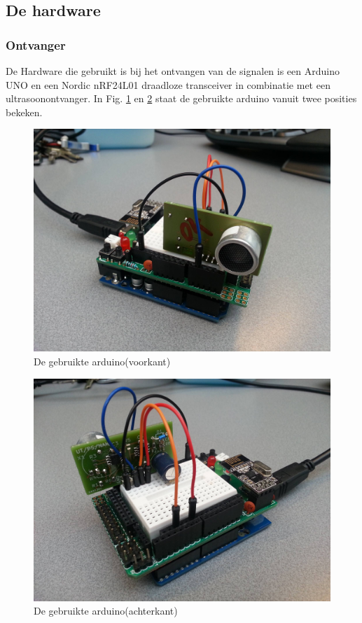 \documentclass{article}
\begin{document}
\subsection{De hardware}
\subsubsection{Ontvanger}
De Hardware die gebruikt is bij het ontvangen van de signalen is een Arduino UNO en een Nordic nRF24L01 draadloze transceiver in combinatie met een ultrasoonontvanger. In Fig. \ref{voorkant} en \ref{achterkant} staat de gebruikte arduino vanuit twee posities bekeken.\\ 
\begin{figure}[h]
\centering\includegraphics[scale=0.06]{voorkant.jpg}
\caption{De gebruikte arduino(voorkant)}
\label{voorkant}
\end{figure}
\begin{figure}[h]
\centering\includegraphics[scale=0.06]{achterkant.jpg}
\caption{De gebruikte arduino(achterkant)}
\label{achterkant}
\end{figure}
\end{document}
